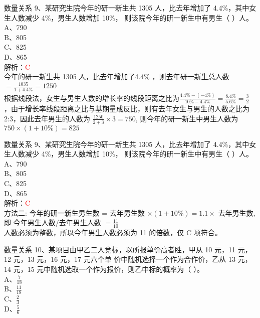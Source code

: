 \documentclass[aspectratio=169]{beamer}
\begin{document}
\begin{frame}[t]{数量关系}
    9、某研究生院今年的研一新生共 1305 人，比去年增加了 4.4\%，其中女生人数减少 4\%，男生人数增加 10\%，
则该院今年的研一新生中有男生（ ）人。\\
A、790\\
B、805\\
C、825\\
D、865\\
    解析：\textcolor{red}{C}\\
    今年的研一新生共 1305 人，比去年增加了4.4\% ，则去年研一新生总人数$=\frac{1035}{1+4.4\%}= 1250$ \\
    根据线段法，女生与男生人数的增长率的线段距离之比为$\frac{4.4\%-(-4\%)}{10\% - 4.4\%} = \frac{8.4\%}{5.6\%} = \frac{3}{2}$\\
    ，由于增长率线段距离之比与基期量成反比，则有去年女生与男生的人数之比为 2:3，因此去年男生的人数为 $\frac{1250}{2+3} \times 3 = 750$,
    则今年的研一新生中男生人数为 $750 \times (1+10\%) = 825$ \\
\end{frame}

\begin{frame}[t]{数量关系}
    9、某研究生院今年的研一新生共 1305 人，比去年增加了 4.4\%，其中女生人数减少 4\%，男生人数增加 10\%，
则该院今年的研一新生中有男生（ ）人。\\
A、790\\
B、805\\
C、825\\
D、865\\
    解析：\textcolor{red}{C}\\
    方法二: 今年的研一新生男生数 = 去年男生数 $\times (1+10\%)  = 1.1 \times $ 去年男生数,即 
    今年男生人数/去年男生人数 $= \frac{11}{10}$ \\
人数必须为整数，所以今年男生人数必须为 11 的倍数，仅 C 项符合。\\
\end{frame}




\begin{frame}[t]{数量关系}
    10、某项目由甲乙二人竞标，以所报单价高者胜，甲从 10 元，11 元，12 元，13 元，16 元，17 元六个单
价中随机选择一个作为合作价，乙从 13 元，14 元，15 元中随机选取一个作为报价，则乙中标的概率为（ ）。\\
    A、$\frac{7}{18}$  \\
    B、$\frac{11}{18}$ \\
    C、$\frac{2}{3} $  \\
    D、$\frac{5}{6} $  \\
\end{frame}
\end{document}
